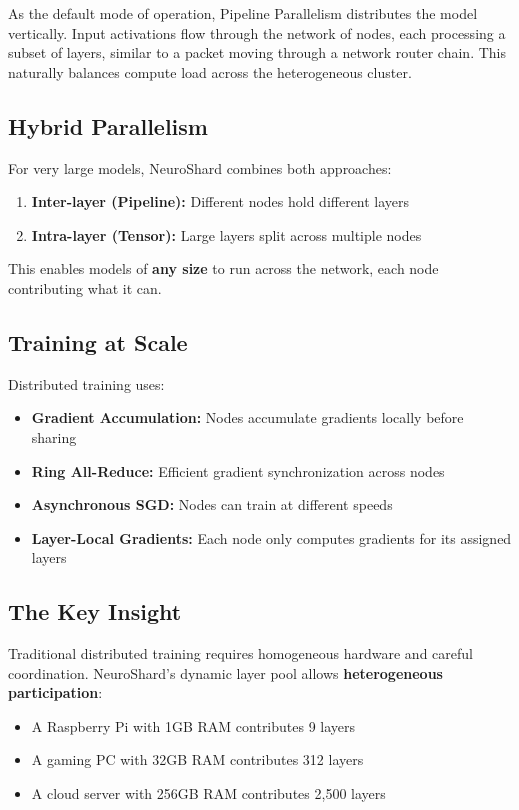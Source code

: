 \documentclass[11pt,a4paper]{article}
\begin{document}
As the default mode of operation, Pipeline Parallelism distributes the model vertically. Input activations flow through the network of nodes, each processing a subset of layers, similar to a packet moving through a network router chain. This naturally balances compute load across the heterogeneous cluster.

\subsection{Hybrid Parallelism}

For very large models, NeuroShard combines both approaches:
\begin{enumerate}
    \item \textbf{Inter-layer (Pipeline):} Different nodes hold different layers
    \item \textbf{Intra-layer (Tensor):} Large layers split across multiple nodes
\end{enumerate}

This enables models of \textbf{any size} to run across the network, each node contributing what it can.

\subsection{Training at Scale}

Distributed training uses:
\begin{itemize}
    \item \textbf{Gradient Accumulation:} Nodes accumulate gradients locally before sharing
    \item \textbf{Ring All-Reduce:} Efficient gradient synchronization across nodes
    \item \textbf{Asynchronous SGD:} Nodes can train at different speeds
    \item \textbf{Layer-Local Gradients:} Each node only computes gradients for its assigned layers
\end{itemize}

\subsection{The Key Insight}

Traditional distributed training requires homogeneous hardware and careful coordination. NeuroShard's dynamic layer pool allows \textbf{heterogeneous participation}:

\begin{itemize}
    \item A Raspberry Pi with 1GB RAM contributes 9 layers
    \item A gaming PC with 32GB RAM contributes 312 layers
    \item A cloud server with 256GB RAM contributes 2,500 layers
\end{itemize}
\end{document}
